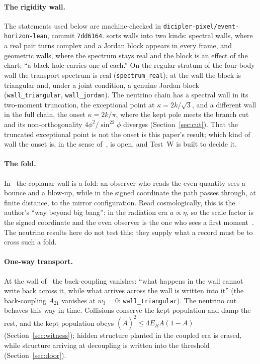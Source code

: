 \paragraph{The rigidity wall.} The statements used below are machine-checked in \texttt{dicipler-pixel/event-horizon-lean}, commit \texttt{7dd6164}. \cite{BH} sorts walls into two kinds: spectral walls, where a real pair turns complex and a Jordan block appears in every frame, and geometric walls, where the spectrum stays real and the block is an effect of the chart; ``a black hole carries one of each.'' On the regular stratum of the four-body wall the transport spectrum is real (\texttt{spectrum\_real}); at the wall the block is triangular and, under a joint condition, a genuine Jordan block (\texttt{wall\_triangular}, \texttt{wall\_jordan}). The neutrino chain has a spectral wall in its two-moment truncation, the exceptional point at $\kappa=2k/\sqrt3$, and a different wall in the full chain, the onset $\kappa=2k/\pi$, where the kept pole meets the branch cut and its non-orthogonality $4\phi^2/\sin^22\phi$ diverges (Section~\ref{sec:cut}). That the truncated exceptional point is not the onset is this paper's result; which kind of wall the onset is, in the sense of~\cite{BH}, is open, and Test~W is built to decide it.

\paragraph{The fold.} In~\cite{BH} the coplanar wall is a fold: an observer who reads the even quantity sees a bounce and a blow-up, while in the signed coordinate the path passes through, at finite distance, to the mirror configuration. Read cosmologically, this is the author's ``way beyond big bang'': in the radiation era $a\propto\eta$, so the scale factor is the signed coordinate and the even observer is the one who sees a first moment~\cite{BFT}. The neutrino results here do not test this; they supply what a record must be to cross such a fold.

\paragraph{One-way transport.} At the wall of~\cite{BH} the back-coupling vanishes: ``what happens in the wall cannot write back across it, while what arrives across the wall is written into it'' (the back-coupling $A_{21}$ vanishes at $w_3=0$: \texttt{wall\_triangular}). The neutrino cut behaves this way in time. Collisions conserve the kept population and damp the rest, and the kept population obeys $(\dot A)^2\le4E_BA(1-A)$ (Section~\ref{sec:witness}); hidden structure planted in the coupled era is erased, while structure arriving at decoupling is written into the threshold (Section~\ref{sec:door}).

